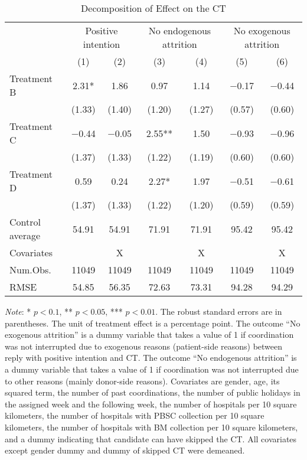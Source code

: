 \documentclass[12pt, a4paper]{article}
\begin{document}
\begin{table}[H]

\caption{\label{tab:lm-test-decompose}Decomposition of Effect on the CT}
\centering
\fontsize{8}{10}\selectfont
\begin{threeparttable}
\begin{tabular}[t]{>{\raggedright\arraybackslash}p{20em}cccccc}
\toprule
\multicolumn{1}{c}{ } & \multicolumn{2}{c}{Positive intention} & \multicolumn{2}{c}{No endogenous attrition} & \multicolumn{2}{c}{No exogenous attrition} \\
\cmidrule(l{3pt}r{3pt}){2-3} \cmidrule(l{3pt}r{3pt}){4-5} \cmidrule(l{3pt}r{3pt}){6-7}
  & (1) & (2) & (3) & (4) & (5) & (6)\\
\midrule
Treatment B & \num{2.31}* & \num{1.86} & \num{0.97} & \num{1.14} & \num{-0.17} & \num{-0.44}\\
 & (\num{1.33}) & (\num{1.40}) & (\num{1.20}) & (\num{1.27}) & (\num{0.57}) & (\num{0.60})\\
Treatment C & \num{-0.44} & \num{-0.05} & \num{2.55}** & \num{1.50} & \num{-0.93} & \num{-0.96}\\
 & (\num{1.37}) & (\num{1.33}) & (\num{1.22}) & (\num{1.19}) & (\num{0.60}) & (\num{0.60})\\
Treatment D & \num{0.59} & \num{0.24} & \num{2.27}* & \num{1.97} & \num{-0.51} & \num{-0.61}\\
 & (\num{1.37}) & (\num{1.33}) & (\num{1.22}) & (\num{1.20}) & (\num{0.59}) & (\num{0.59})\\
\midrule
Control average & 54.91 & 54.91 & 71.91 & 71.91 & 95.42 & 95.42\\
Covariates &  & X &  & X &  & X\\
Num.Obs. & \num{11049} & \num{11049} & \num{11049} & \num{11049} & \num{11049} & \num{11049}\\
RMSE & \num{54.85} & \num{56.35} & \num{72.63} & \num{73.31} & \num{94.28} & \num{94.29}\\
\bottomrule
\end{tabular}
\begin{tablenotes}
\item \emph{Note}: * $p < 0.1$, ** $p < 0.05$, *** $p < 0.01$. The robust standard errors are in parentheses. The unit of treatment effect is a percentage point. The outcome ``No exogenous attrition'' is a dummy variable that takes a value of 1 if coordination was not interrupted due to exogenous reasons (patient-side reasons) between reply with positive intention and CT. The outcome ``No endogenous attrition'' is a dummy variable that takes a value of 1 if coordination was not interrupted due to other reasons (mainly donor-side reasons). Covariates are gender, age, its squared term, the number of past coordinations, the number of public holidays in the assigned week and the following week, the number of hospitals per 10 square kilometers, the number of hospitals with PBSC collection per 10 square kilometers, the number of hospitals with BM collection per 10 square kilometers, and a dummy indicating that candidate can have skipped the CT. All covariates except gender dummy and dummy of skipped CT were demeaned.

\end{tablenotes}
\end{threeparttable}
\end{table}
\end{document}
